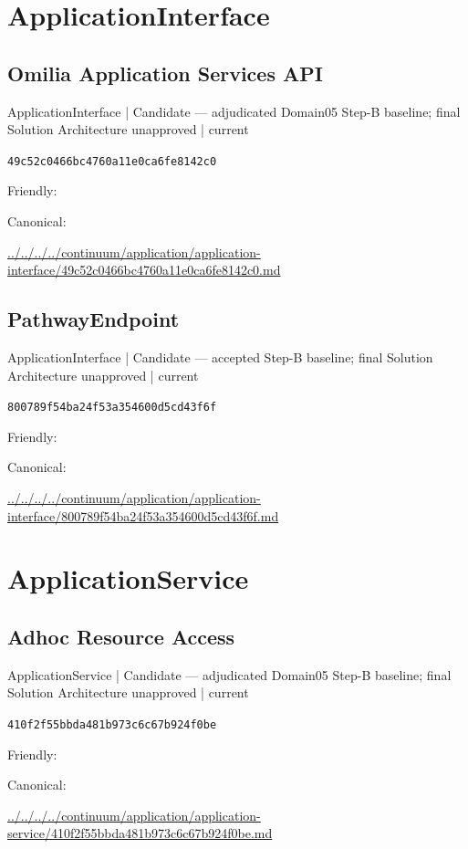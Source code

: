 \documentclass[10pt,a4paper]{article}
\begin{document}
\section*{ApplicationInterface}
\subsection*{Omilia Application Services API}
{\small ApplicationInterface | Candidate — adjudicated Domain05 Step-B baseline; final Solution Architecture unapproved | current}\par
\texttt{49c52c0466bc4760a11e0ca6fe8142c0}\par
Friendly: \par
Canonical: \par
{\footnotesize\url{../../../../continuum/application/application-interface/49c52c0466bc4760a11e0ca6fe8142c0.md}}\par
\subsection*{PathwayEndpoint}
{\small ApplicationInterface | Candidate — accepted Step-B baseline; final Solution Architecture unapproved | current}\par
\texttt{800789f54ba24f53a354600d5cd43f6f}\par
Friendly: \par
Canonical: \par
{\footnotesize\url{../../../../continuum/application/application-interface/800789f54ba24f53a354600d5cd43f6f.md}}\par
\section*{ApplicationService}
\subsection*{Adhoc Resource Access}
{\small ApplicationService | Candidate — adjudicated Domain05 Step-B baseline; final Solution Architecture unapproved | current}\par
\texttt{410f2f55bbda481b973c6c67b924f0be}\par
Friendly: \par
Canonical: \par
{\footnotesize\url{../../../../continuum/application/application-service/410f2f55bbda481b973c6c67b924f0be.md}}\par
\end{document}

